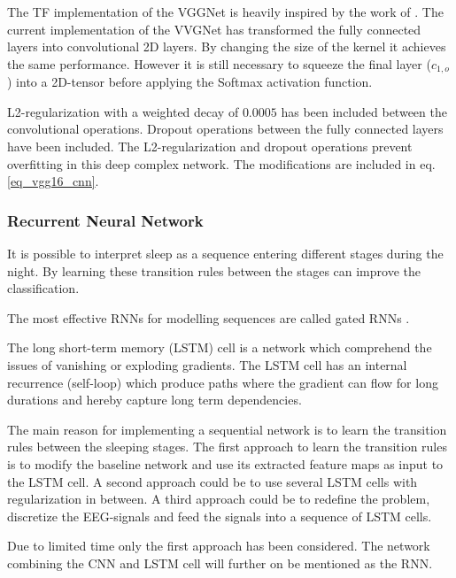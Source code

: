 The TF implementation of the VGGNet is heavily inspired by the work of \cite{git_vgg16}. 
The current implementation of the VVGNet has transformed the fully connected layers into convolutional 2D layers. By changing the size of the kernel it achieves the same performance. However it is still necessary to squeeze the final layer ($c_{1,o}$) into a 2D-tensor before applying the Softmax activation function.

L2-regularization with a weighted decay of $0.0005$ has been included between the convolutional operations. Dropout operations between the fully connected layers have been included.
The L2-regularization and dropout operations prevent overfitting in this deep complex network. The modifications are included in eq. \ref{eq_vgg16_cnn}.
  


\subsubsection{Recurrent Neural Network}
It is possible to interpret sleep as a sequence entering different stages during the night. By learning these transition rules between the stages can improve the classification.

The most effective RNNs for modelling sequences are called gated RNNs \cite[sec. 10.10]{dl_book}. 

The long short-term memory (LSTM) cell is a network which comprehend the issues of vanishing or exploding gradients. The LSTM cell has an internal recurrence (self-loop) which produce paths where the gradient can flow for long durations and hereby capture long term dependencies.  

The main reason for implementing a sequential network is to learn the transition rules between the sleeping stages.
The first approach to learn the transition rules is to modify the baseline network and use its extracted feature maps as input to the LSTM cell. A second approach could be to use several LSTM cells with regularization in between. A third approach could be to redefine the problem, discretize the EEG-signals and feed the signals into a sequence of LSTM cells.

Due to limited time only the first approach has been considered. The network combining the CNN and LSTM cell will further on be mentioned as the RNN.

